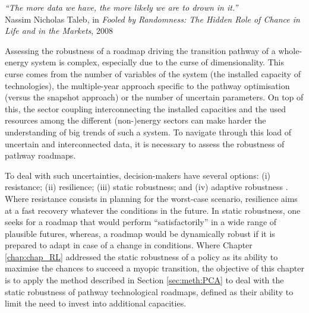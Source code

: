 \vspace{-0.2cm}
\begin{flushright}
\emph{``The more data we have, the more likely we are to drown in it.''}\\
Nassim Nicholas Taleb, in \textit{Fooled by Randomness: The Hidden Role of Chance in Life and in the Markets}, 2008
\end{flushright}
\vspace{0.4cm}

Assessing the robustness of a roadmap driving the transition pathway of a whole-energy system is complex, especially due to the curse of dimensionality. This curse comes from the number of variables of the system (\eg the installed capacity of technologies), the multiple-year approach specific to the pathway optimisation (\ie versus the snapshot approach) or the number of uncertain parameters. On top of this, the sector coupling interconnecting the installed capacities and the used resources among the different (non-)energy sectors can make harder the understanding of big trends of such a system. To navigate through this load of uncertain and interconnected data, it is necessary to assess the robustness of pathway roadmaps.

To deal with such uncertainties, decision-makers have several options: (i) resistance; (ii) resilience; (iii) static robustness; and (iv) adaptive robustness \cite{walker2012deep}. Where resistance consists in planning for the worst-case scenario, resilience aims at a fast recovery whatever the conditions in the future. In static robustness, one seeks for a roadmap that would perform ``satisfactorily'' in a wide range of plausible futures, whereas, a roadmap would be dynamically robust if it is prepared to adapt in case of a change in conditions. Where Chapter \ref{chap:chap_RL} addressed the static robustness of a policy as its ability to maximise the chances to succeed a myopic transition, the objective of this chapter is to apply the method described in Section \ref{sec:meth:PCA} to deal with the static robustness of pathway technological roadmaps, defined as their ability to limit the need to invest into additional capacities.

